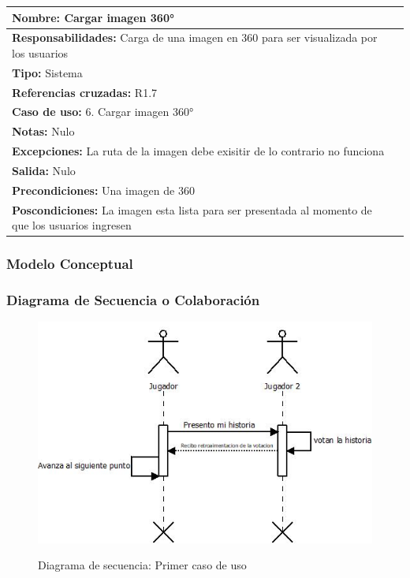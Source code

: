 \begin{table}[H]
    \begin{center}
        \begin{tabular}{| l | m{12cm} |}          
        	\hline 
        	\textbf{Nombre:} Cargar imagen 360°\\
        	\hline
        	\textbf{Responsabilidades:} Carga de una imagen en 360 para ser visualizada por los usuarios\\
        	\hline
        	\textbf{Tipo:} Sistema\\
        	\hline
        	\textbf{Referencias cruzadas:} R1.7\\
        	\hline
        	\textbf{Caso de uso:} 6. Cargar imagen 360°\\
        	\hline
        	\textbf{Notas:} Nulo\\
        	\hline
        	\textbf{Excepciones:} La ruta de la imagen debe exisitir de lo contrario no funciona\\
        	\hline
        	\textbf{Salida:} Nulo\\
        	\hline
        	\textbf{Precondiciones:} Una imagen de 360 \\
        	\hline
        	\textbf{Poscondiciones:} La imagen esta lista para ser presentada al momento de que los usuarios ingresen\\
        	\hline
        \end{tabular}
    \end{center}
\end{table}

\subsubsection{Modelo Conceptual}
\subsubsection{Diagrama de Secuencia o Colaboración}
\begin{figure}[htbp]
\centering
   \includegraphics[scale=0.9]{imgs/DS_1.jpeg}
   \begin{center}
   Diagrama de secuencia: Primer caso de uso
   \end{center}
\end{figure}

